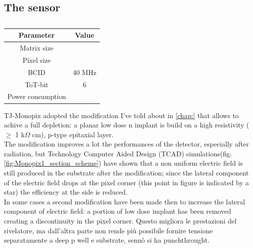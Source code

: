 \subsection{The sensor}
    \begin{table}
        \begin{center}
        \begin{tabular}{| c |c |}
        \hline
        Parameter & Value\\
        \hline
        \hline
        Matrix size & \\
        Pixel size & \\
        BCID & 40 MHz \\
        ToT-bit & 6 \\
        Power consumption & \\
        \hline
        \end{tabular}
        \caption{}
        \label{tab:LF-TJ-Monopix}
        \end{center}
    \end{table}
    TJ-Monopix adopted the modification I've told about in \ref{chap:} that allows to achive a full depletion: a planar low dose n implant is build on a high resistivity ($\geq $ 1 k$\Omega$ cm), p-type epitaxial layer.\\
    The modification improves a lot the performances of the detector, especially after radiation, but  Technology Computer Aided Design (TCAD) simulations(fig.\ref{fig:Monopix1_section_scheme}) have shown that a non uniform electric field is still produced in the substrate after the modification; since the lateral component of the electric field drops at the pixel corner (this point in figure is indicated by a star) the efficiency at the side is reduced. \\
    In some cases a second modification have been made then to increase the lateral component of electric field: a portion of low dose implant has been removed creating a discontinuity in the pixel corner. Questo migliora le prestazioni del rivelatore, ma dall'altra parte non rende più possibile fornire tensione separatamente a deep p well e substrate, sennò si ha punchthrought.\\

